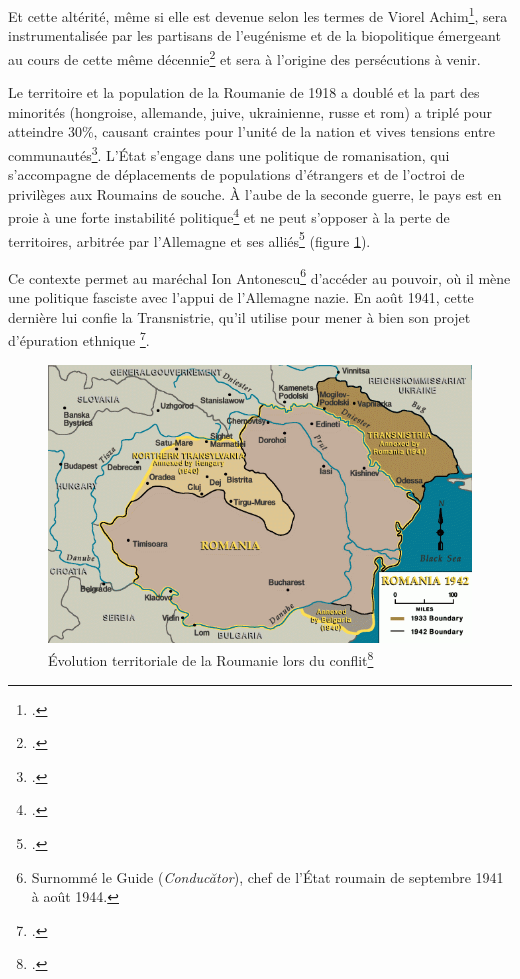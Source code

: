 \documentclass[a4paper,12pt,twoside]{book}
\begin{document}
            Et cette altérité, même si elle est devenue \fg{} selon les termes de Viorel Achim\footcite{achimDeportationRromsTransnistrie2016}, sera instrumentalisée par les partisans de l’eugénisme et de la biopolitique émergeant au cours de cette même décennie\footcite{wedekindMATHEMATIZATIONHUMANBEING2010} et sera à l'origine des persécutions à venir.
            \pagebreak
            
            Le territoire et la population de la Roumanie de 1918 a doublé et la part des minorités (hongroise, allemande, juive, ukrainienne, russe et rom) a triplé pour atteindre 30\%, causant craintes pour l'unité de la nation et vives tensions entre communautés\footcite{sanduRoumanieVictoirePyrrhus2015,MajorityQuestionInterwar2020}. L'État s'engage dans une politique de \og{}romanisation\fg{}, qui s'accompagne de déplacements de populations d'\og{}étrangers\fg{} et de l'octroi de privilèges aux Roumains \og{}de souche\fg{}. À l'aube de la seconde guerre, le pays est en proie à une forte instabilité politique\footcites{zahariaViePolitiqueRoumanie1985,blasenNominationCabinetGoga2018} et ne peut s'opposer à la perte de territoires, arbitrée par l'Allemagne et ses alliés\footcite{haynesGermanyEstablishmentRomanian1999} (figure \ref{fig2}).
            
            Ce contexte permet au maréchal Ion Antonescu\footnote{Surnommé le \og{}Guide\fg{} (\og{}\textit{Conducător}\fg{}), chef de l'État roumain de septembre 1941 à août 1944.} d'accéder au pouvoir, où il mène une politique fasciste avec l'appui de l'Allemagne nazie. En août 1941, cette dernière lui confie la Transnistrie, qu'il utilise pour mener à bien son projet d'épuration ethnique \footcites{achimDeportationRromsTransnistrie2016,benjaminPolitiqueAntijuiveRegime2011}.
            
            \begin{figure}[!ht]
    		    \centering
                \includegraphics[width=12cm]{images/roumanie19331942.png}
                \caption{Évolution territoriale de la Roumanie lors du conflit\footcite{Romania1942}}
                \label{fig2}
            \end{figure}
        
\end{document}

